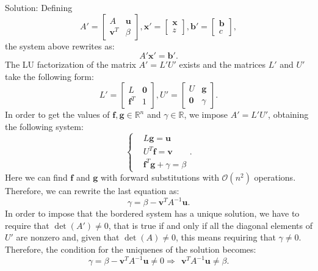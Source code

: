 \documentclass[a4paper,11pt]{article}
\newcommand{\R}{\mathbb{R}}
\begin{document}
\noindent Solution: Defining 
\begin{equation}\label{key}
	A' = 
	\begin{bmatrix}
		A &  \textbf{u} \\ 
		\textbf{v}^T & \beta 
	\end{bmatrix}, 
	\textbf{x}' = \begin{bmatrix}
		\textbf{x} \\ 
		z
	\end{bmatrix}, 
	\textbf{b}' = 
	\begin{bmatrix}
		\textbf{b} \\ 
		c
	\end{bmatrix},
\end{equation}
the system above rewrites as:
\begin{equation}\label{key}
	A' \textbf{x}' = \textbf{b}'.
\end{equation}
The LU factorization of the matrix $A' = L' U'$ exists and the matrices $L'$ and $U'$ take the following form:
\begin{equation}\label{key}
	L' = 
	\begin{bmatrix}
		L &  \textbf{0} \\ 
		\textbf{f}^T & 1 
	\end{bmatrix}, 	
	U' = 
	\begin{bmatrix}
		U&  \textbf{g} \\ 
		\textbf{0} & \gamma
	\end{bmatrix}.
\end{equation}
In order to get the values of $\textbf{f}, \textbf{g}\in \R^n$ and $\gamma \in \R$, we impose $ A' = L' U'$, obtaining the following system:
\begin{equation}\label{key}
	\left\lbrace 
	\begin{split}
		& L\textbf{g} = \textbf{u}\\
		& U^T \textbf{f} = \textbf{v}\\
		&\textbf{f}^T \textbf{g} + \gamma = \beta
	\end{split} \right.  .
\end{equation}
Here we can find $\textbf{f}$ and $\textbf{g}$ with forward substitutions with $\mathcal{O}(n^2)$ operations. Therefore, we can rewrite the last equation as:
\begin{equation}\label{key}
	\gamma = \beta - \textbf{v}^T A^{-1} \textbf{u} .
\end{equation}
In order to impose that the bordered system has a unique solution, we have to require that $\det(A') \neq 0$, that is true if and only if all the diagonal elements of $U'$ are nonzero and, given that $\det(A)\neq 0$, this means requiring that $\gamma \neq 0 $. Therefore, the condition for the uniquenes of the solution becomes:
\begin{equation}\label{key}
	\gamma = \beta - \textbf{v}^T A^{-1} \textbf{u} \neq 0 \Rightarrow \ \ \textbf{v}^T A^{-1} \textbf{u} \neq \beta.
\end{equation}
	
\end{document}
